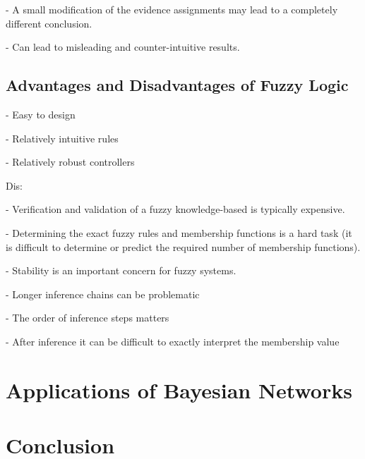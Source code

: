 \documentclass[11pt]{article}
\begin{document}
- A small modification of the evidence assignments may lead to a completely
different conclusion.

- Can lead to misleading and counter-intuitive results.

\subsection{Advantages and Disadvantages of Fuzzy Logic}

- Easy to design 

- Relatively intuitive rules 

- Relatively robust controllers 

Dis:

- Verification and validation of a fuzzy knowledge-based is typically expensive.

- Determining the exact fuzzy rules and membership functions is a hard task
(it is difficult to determine or predict the required number of membership
functions).

- Stability is an important concern for fuzzy systems.

- Longer inference chains can be problematic 

- The order of inference steps matters

- After inference it can be difficult to exactly interpret the membership value 


\section{Applications of Bayesian Networks}

\section{Conclusion}



\end{document}
